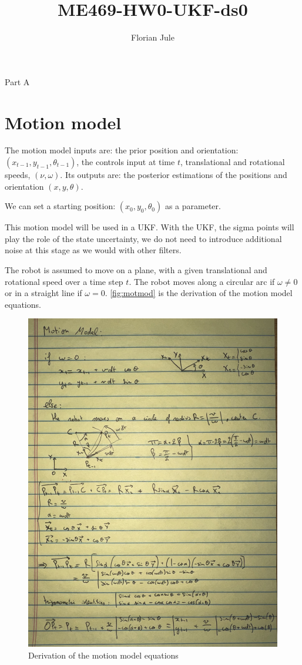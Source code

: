 \documentclass{article}
\title{ME469-HW0-UKF-ds0}
\author{Florian Jule}
\begin{document}
\maketitle

\large{Part A}
\normalsize{}

\section{Motion model}

The motion model inputs are: the prior position and orientation: $(x_{t-1}, y_{t-1}, \theta_{t-1})$, the controls input at time $t$, translational and rotational speeds, $(\nu,\omega)$. 
Its outputs are: the posterior estimations of the positions and orientation $(x, y, \theta)$.

We can set a starting position: $(x_0, y_0, \theta_0)$ as a parameter.

This motion model will be used in a UKF. With the UKF, the sigma points will play the role of the state uncertainty, we do not need to introduce additional noise at this stage as we would with other filters.

The robot is assumed to move on a plane, with a given translational and rotational speed over a time step $t$. The robot moves along a circular  arc if $\omega \neq 0$ or in a straight line if $\omega=0$. \autoref{fig:motmod} is the derivation of the motion model equations.

\begin{figure}
\centering
\includegraphics[scale=0.3]{motion_model.jpeg}
\caption{Derivation of the motion model equations}
\label{fig:motmod}
\end{figure}
\end{document}
